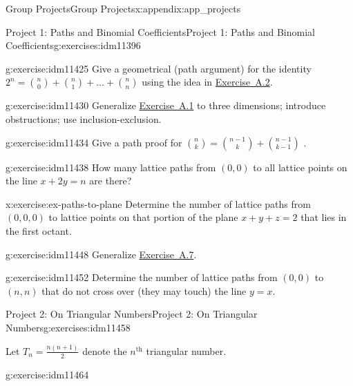 \documentclass[oneside,10pt,]{book}
\numberwithin{equation}{chapter}
\begin{document}
\begin{appendixptx}{Group Projects}{}{Group Projects}{}{}{x:appendix:app_projects}
\begin{exercises-section-numberless}{Project 1: Paths and Binomial Coefficients}{}{Project 1: Paths and Binomial Coefficients}{}{}{g:exercises:idm11396}
\begin{divisionexercise}{3}{}{}{g:exercise:idm11425}
Give a geometrical (path argument) for the identity \(2^{n} =
\binom{n}{0}
+
\binom{n}{1}
+ \ldots +
\binom{n}{n}\) using the idea in \hyperlink{x:exercise:ex-paths-on-lines}{Exercise~A.2}.%
\end{divisionexercise}%
\begin{divisionexercise}{4}{}{}{g:exercise:idm11430}%
Generalize \hyperlink{x:exercise:ex-count-paths}{Exercise~A.1} to three dimensions; introduce obstructions; use inclusion-exclusion.%
\end{divisionexercise}%
\begin{divisionexercise}{5}{}{}{g:exercise:idm11434}%
Give a path proof for \(\binom{n}{k}
=
\binom{n - 1}{k}
+
\binom{n - 1}{k - 1}\) .%
\end{divisionexercise}%
\begin{divisionexercise}{6}{}{}{g:exercise:idm11438}%
How many lattice paths from \(\left( 0,0 \right)\) to all lattice points on the line \(x + 2y = n\) are there?%
\end{divisionexercise}%
\begin{divisionexercise}{7}{}{}{x:exercise:ex-paths-to-plane}%
Determine the number of lattice paths from \(\left( 0,0,0 \right)\) to lattice points on that portion of the plane \(x + y + z = 2\) that lies in the first octant.%
\end{divisionexercise}%
\begin{divisionexercise}{8}{}{}{g:exercise:idm11448}%
Generalize \hyperlink{x:exercise:ex-paths-to-plane}{Exercise~A.7}.%
\end{divisionexercise}%
\begin{divisionexercise}{9}{}{}{g:exercise:idm11452}%
Determine the number of lattice paths from \(\left( 0,0 \right)\) to \((n,n)\) that do not cross over (they may touch) the line \(y = x\).%
\end{divisionexercise}%
\end{exercises-section-numberless}
%
%
\typeout{************************************************}
\typeout{************************************************}
%
\begin{exercises-section-numberless}{Project 2: On Triangular Numbers}{}{Project 2: On Triangular Numbers}{}{}{g:exercises:idm11458}
\begin{introduction}{}%
Let \(T_{n} = \frac{n\left( n + 1 \right)}{2}\) denote the \(n^{\text{th}}\) triangular number.%
\end{introduction}%
\begin{divisionexercise}{1}{}{}{g:exercise:idm11464}%

\end{divisionexercise}
\end{exercises-section-numberless}
\end{appendixptx}
\end{document}
